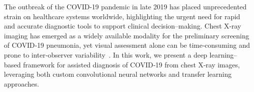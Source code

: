 \documentclass[conference]{IEEEtran}
\begin{document}

The outbreak of the COVID-19 pandemic in late 2019 has placed unprecedented strain on healthcare systems worldwide, highlighting the urgent need for rapid and accurate diagnostic tools to support clinical decision–making. Chest X‑ray imaging has emerged as a widely available modality for the preliminary screening of COVID‑19 pneumonia, yet visual assessment alone can be time‑consuming and prone to inter‑observer variability~\cite{b1,b2}. In this work, we present a deep learning–based framework for assisted diagnosis of COVID‑19 from chest X‑ray images, leveraging both custom convolutional neural networks and transfer learning approaches.
\end{document}
